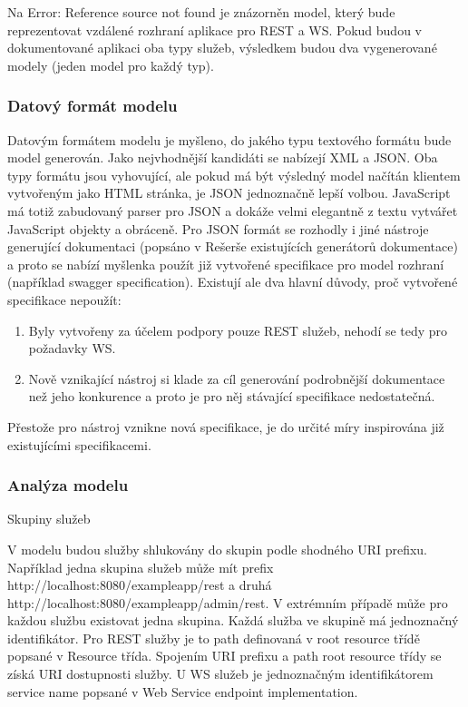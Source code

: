 \documentclass[11pt,twoside,a4paper]{book}
\begin{document}
\begin{itemize}
Na Error: Reference source not found je znázorněn model, který bude reprezentovat vzdálené
rozhraní aplikace pro REST a WS. Pokud budou v dokumentované aplikaci oba typy služeb,
výsledkem budou dva vygenerované modely (jeden model pro každý typ).

\subsubsection{Datový formát modelu}

Datovým formátem modelu je myšleno, do jakého typu textového formátu bude model
generován. Jako nejvhodnější kandidáti se nabízejí XML a JSON. Oba typy formátu jsou
vyhovující, ale pokud má být výsledný model načítán klientem vytvořeným jako HTML
stránka, je JSON jednoznačně lepší volbou. JavaScript má totiž zabudovaný parser pro JSON
a dokáže velmi elegantně z textu vytvářet JavaScript objekty a obráceně. Pro JSON formát se
rozhodly i jiné nástroje generující dokumentaci (popsáno v Rešerše existujících generátorů
dokumentace) a proto se nabízí myšlenka použít již vytvořené specifikace pro model rozhraní
(například swagger specification). Existují ale dva hlavní důvody, proč vytvořené specifikace
nepoužít:

\begin{enumerate}
  \item Byly vytvořeny za účelem podpory pouze REST služeb, nehodí se tedy pro požadavky
WS.
  \item Nově vznikající nástroj si klade za cíl generování podrobnější dokumentace než jeho
konkurence a proto je pro něj stávající specifikace nedostatečná.
\end{enumerate}

Přestože pro nástroj vznikne nová specifikace, je do určité míry inspirována již existujícími
specifikacemi.

\subsubsection{Analýza modelu}

Skupiny služeb

V modelu budou služby shlukovány do skupin podle shodného URI prefixu. Například jedna
skupina služeb může mít prefix http://localhost:8080/exampleapp/rest a
druhá http://localhost:8080/exampleapp/admin/rest. V extrémním případě
může pro každou službu existovat jedna skupina. Každá služba ve skupině má jednoznačný
identifikátor. Pro REST služby je to path definovaná v root resource třídě popsané v Resource
třída. Spojením URI prefixu a path root resource třídy se získá URI dostupnosti služby. U WS
služeb je jednoznačným identifikátorem service name popsané v Web Service endpoint
implementation.


\end{itemize}
\end{document}
